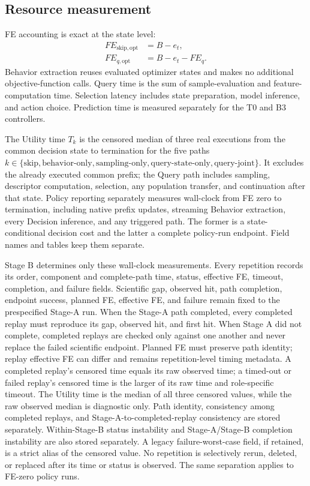 \subsection{Resource measurement}

FE accounting is exact at the state level:
\begin{align}
  FE_{\mathrm{skip,opt}} &= B-e_t,\\
  FE_{q,\mathrm{opt}} &= B-e_t-FE_q.
\end{align}
Behavior extraction reuses evaluated optimizer states and makes no additional
objective-function calls.  Query time is the sum of sample-evaluation and
feature-computation time.  Selection latency includes state preparation, model
inference, and action choice.  Prediction time is measured separately for the
T0 and B3 controllers.

The Utility time $T_k$ is the censored median of three real executions from the common
decision state to termination for the five paths
$k\in\{\mathrm{skip},\mathrm{behavior\mbox{-}only},\mathrm{sampling\mbox{-}only},\mathrm{query\mbox{-}state\mbox{-}only},\mathrm{query\mbox{-}joint}\}$.  It
excludes the already executed common prefix; the Query path includes sampling,
descriptor computation, selection, any population transfer, and continuation
after that state.  Policy reporting separately measures wall-clock from FE zero
to termination, including native prefix updates, streaming Behavior extraction,
every Decision inference, and any triggered path.  The former is a
state-conditional decision cost and the latter a complete policy-run endpoint.
Field names and tables keep them separate.

Stage B determines only these wall-clock measurements.  Every repetition records its
order, component and complete-path time, status, effective FE, timeout,
completion, and failure fields.  Scientific gap, observed hit, path completion,
endpoint success, planned FE, effective FE, and failure remain fixed to the
prespecified Stage-A run.
When the Stage-A path completed, every completed replay must reproduce its gap,
observed hit, and first hit.  When Stage A did not complete, completed replays are
checked only against one another and never replace the failed scientific
endpoint.  Planned FE must preserve path identity; replay effective FE can differ
and remains repetition-level timing metadata.  A completed replay's censored
time equals its raw observed time; a timed-out or failed replay's censored time
is the larger of its raw time and role-specific timeout.  The Utility time is
the median of all three censored values, while the raw observed median is
diagnostic only.  Path identity, consistency among completed replays, and
Stage-A-to-completed-replay consistency are stored separately.  Within-Stage-B
status instability and Stage-A/Stage-B completion instability are also stored
separately.  A legacy failure-worst-case field, if retained, is a strict alias
of the censored value.  No repetition is selectively rerun, deleted, or replaced after
its time or status is observed.  The same separation applies to FE-zero policy
runs.

